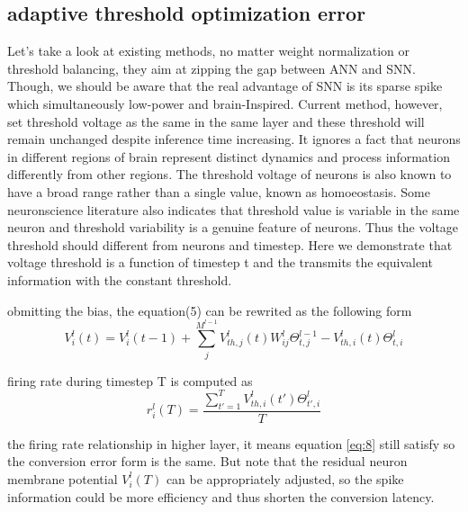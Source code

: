 \documentclass{article}
\begin{document}
\subsection{adaptive threshold optimization error}
Let's take a look at existing methods, no matter weight normalization or threshold balancing, they aim at zipping the gap between ANN and SNN. Though, we should be aware that
the real advantage of SNN is its sparse spike which simultaneously low-power and brain-Inspired. Current method, however, set threshold voltage as the same in the same layer and 
these threshold will remain unchanged despite inference time increasing. It ignores a fact that neurons in different
regions of brain represent distinct dynamics and process information differently from other regions\cite{mochizuki2016similarity}. 
The threshold voltage of neurons is also known to have a broad
range rather than a single value, known as homoeostasis\cite{marder2006variability}. Some neuronscience literature also indicates that threshold value 
is variable in the same neuron and threshold 
variability is a genuine feature of neurons\cite{azouz2000dynamic, henze2001action, azouz2003adaptive, pena2002postsynaptic, wilent2005stimulus}. Thus the voltage threshold should different from neurons and timestep. Here we demonstrate that voltage threshold is a function of timestep t and the transmits the equivalent information with the constant threshold.

obmitting the bias, the equation(5) can be rewrited as the following form
\begin{equation}
  V_i^l(t)=V_{i}^{l}(t-1)+\sum_j^{M^{l-1}}V_{th,j}^l(t)W_{ij}^l\Theta_{t,j}^{l-1} -V_{th,i}^l(t)\Theta_{t,i}^{l}
\end{equation}

firing rate during timestep T is computed as 
\begin{equation}
  r_i^l(T) = \frac{\sum_{t'=1}^{T}V_{th,i}^l(t')\Theta_{t',i}^{l}}{T}
\end{equation}

the firing rate relationship in higher layer, it means equation \ref{eq:8} still satisfy so the conversion error form is the same.
But note that the residual neuron membrane potential $V_i^l(T)$ can be appropriately adjusted, so the spike information could be more efficiency and thus shorten the conversion latency. 
\end{document}
